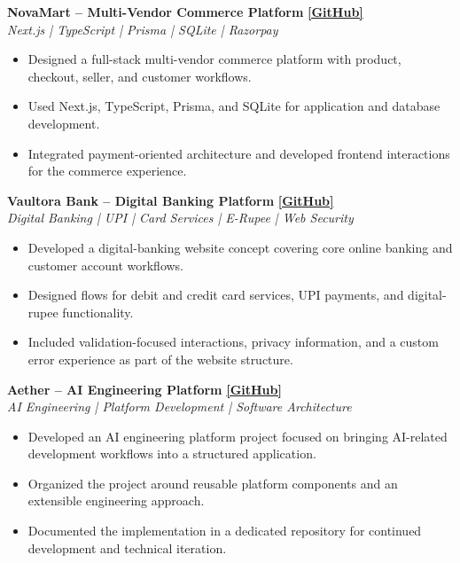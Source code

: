 \documentclass[10pt,a4paper]{article}
\newcommand{\resumeProject}[3]{
    \textbf{#1}
    \hfill
    \href{#3}{\textbf{[GitHub]}}
    \\
    \textit{#2}
    \vspace{1pt}
}
\newcommand{\resumeProjectEnd}{
    \vspace{3pt}
}
\begin{document}
\resumeProject
{NovaMart -- Multi-Vendor Commerce Platform}
{Next.js | TypeScript | Prisma | SQLite | Razorpay}
{https://github.com/BijoySarkar19/NovaMart-Multi-Vendor-Ecommerce}

\begin{itemize}[leftmargin=14pt, itemsep=1pt, topsep=1pt]
    \item Designed a full-stack multi-vendor commerce platform with product, checkout, seller, and customer workflows.
    \item Used Next.js, TypeScript, Prisma, and SQLite for application and database development.
    \item Integrated payment-oriented architecture and developed frontend interactions for the commerce experience.
\end{itemize}
\resumeProjectEnd

\resumeProject
{Vaultora Bank -- Digital Banking Platform}
{Digital Banking | UPI | Card Services | E-Rupee | Web Security}
{https://github.com/BijoySarkar19/Vaultora-Bank}

\begin{itemize}[leftmargin=14pt, itemsep=1pt, topsep=1pt]
    \item Developed a digital-banking website concept covering core online banking and customer account workflows.
    \item Designed flows for debit and credit card services, UPI payments, and digital-rupee functionality.
    \item Included validation-focused interactions, privacy information, and a custom error experience as part of the website structure.
\end{itemize}
\resumeProjectEnd

\resumeProject
{Aether -- AI Engineering Platform}
{AI Engineering | Platform Development | Software Architecture}
{https://github.com/BijoySarkar19/aether-ai-engineering-platform}

\begin{itemize}[leftmargin=14pt, itemsep=1pt, topsep=1pt]
    \item Developed an AI engineering platform project focused on bringing AI-related development workflows into a structured application.
    \item Organized the project around reusable platform components and an extensible engineering approach.
    \item Documented the implementation in a dedicated repository for continued development and technical iteration.
\end{itemize}
\resumeProjectEnd
\end{document}
